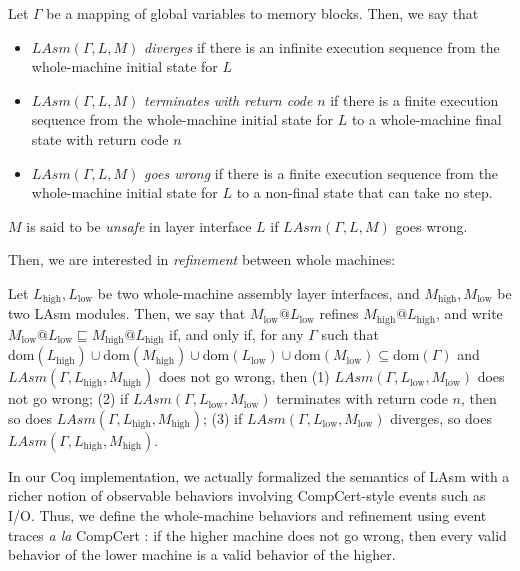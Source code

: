 \begin{definition}
Let $\Gamma$ be a mapping of global variables to memory blocks. Then, we say that
\begin{itemize}
\item $\mathit{LAsm}(\Gamma, L, M)$ \emph{diverges} if there is an
  infinite execution sequence from the whole-machine initial state for $L$
\item $\mathit{LAsm}(\Gamma, L, M)$ \emph{terminates with return code} $n$ if there is a finite execution sequence from the whole-machine initial state for $L$ to a whole-machine final state with return code $n$
\item $\mathit{LAsm}(\Gamma, L, M)$ \emph{goes wrong} if there is a finite execution sequence from the whole-machine initial state for $L$ to a non-final state that can take no step.
\end{itemize}
$M$ is said to be \emph{unsafe} in layer interface $L$ if $\mathit{LAsm}(\Gamma, L, M)$ goes wrong.
\end{definition}

Then, we are interested in \emph{refinement} between whole machines:
\begin{definition}
Let $L_{\text{high}}, L_{\text{low}}$ be two whole-machine assembly
layer interfaces, and $M_{\text{high}}, M_{\text{low}}$ be two LAsm
modules. Then, we say that $M_{\text{low}} @ L_{\text{low}}$ refines
$M_{\text{high}} @ L_{\text{high}}$, and write $M_{\text{low}} @
L_{\text{low}} \sqsubseteq M_{\text{high}} @ L_{\text{high}}$ if,
and only if, for any $\Gamma$ such that $
\mathrm{dom}(L_{\text{high}}) \cup \mathrm{dom}(M_{\text{high}}) \cup
\mathrm{dom}(L_{\text{low}}) \cup \mathrm{dom}(M_{\text{low}})
\subseteq \mathrm{dom}(\Gamma)$ and $\mathit{LAsm}(\Gamma, L_{\text{high}},
M_{\text{high}})$ does not go wrong, then
(1) $\mathit{LAsm}(\Gamma, L_{\text{low}}, M_{\text{low}})$ does not go wrong;
(2) if $\mathit{LAsm}(\Gamma, L_{\text{low}}, M_{\text{low}})$
  terminates with return code $n$, then so does $\mathit{LAsm}(\Gamma,
  L_{\text{high}}, M_{\text{high}})$;
(3) if $\mathit{LAsm}(\Gamma, L_{\text{low}}, M_{\text{low}})$
  diverges, so does $\mathit{LAsm}(\Gamma, L_{\text{high}},
  M_{\text{high}})$.
\end{definition}

In our Coq implementation, we actually formalized the semantics of
LAsm with a richer notion of observable behaviors involving
CompCert-style events such as I/O. Thus, we define the
whole-machine behaviors and refinement using event traces 
{\em a la} CompCert \cite[3.5 sqq.]{Leroy-backend}: if the higher machine does
not go wrong, then every valid behavior of the lower machine is a
valid behavior of the higher.

